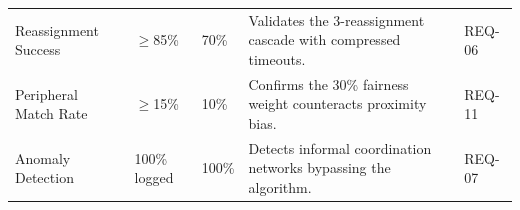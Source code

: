 \documentclass[9pt,conference]{IEEEtran}
\begin{document}
\begin{table}[htbp]
\begin{threeparttable}
\begin{tabularx}{\textwidth}{@{} l l l X l @{}}
Reassignment Success        & $\geq$85\%          & 70\%          & Validates the 3-reassignment cascade with compressed timeouts.                             & REQ-06 \\
Peripheral Match Rate       & $\geq$15\%          & 10\%          & Confirms the 30\% fairness weight counteracts proximity bias.                               & REQ-11 \\
Anomaly Detection           & 100\% logged        & 100\%         & Detects informal coordination networks bypassing the algorithm.                             & REQ-07 \\
\bottomrule
\end{tabularx}
\end{threeparttable}
\end{table}
\end{document}
